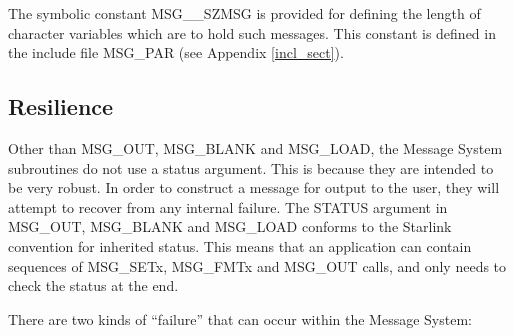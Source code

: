 The symbolic constant MSG\_\_SZMSG is provided for defining the length of 
character variables which are to hold such messages.
This constant is defined in the include file MSG\_PAR (see Appendix
\ref{incl_sect}).


\subsection {Resilience}

Other than MSG\_OUT, MSG\_BLANK and MSG\_LOAD, the Message System subroutines do
not use a status argument. 
This is because they are intended to be very robust.
In order to construct a message for output to the user, they will attempt to 
recover from any internal failure. 
The STATUS argument in MSG\_OUT, MSG\_BLANK and MSG\_LOAD conforms to the
Starlink convention for inherited status.
This means that an application can contain sequences of MSG\_SETx, MSG\_FMTx
and MSG\_OUT calls, and only needs to check the status at the end.

There are two kinds of ``failure'' that can occur within the Message
System:

